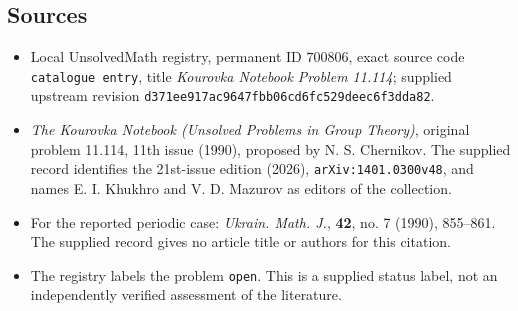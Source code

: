 \documentclass[11pt]{article}
\begin{document}
\subsection{Sources}
\begin{itemize}
\item Local UnsolvedMath registry, permanent ID \(700806\), exact source code \texttt{catalogue entry}, title \emph{Kourovka Notebook Problem 11.114}; supplied upstream revision \texttt{d371ee917ac9647fbb06cd6fc529deec6f3dda82}.
\item \emph{The Kourovka Notebook (Unsolved Problems in Group Theory)}, original problem 11.114, 11th issue (1990), proposed by N. S. Chernikov. The supplied record identifies the 21st-issue edition (2026), \texttt{arXiv:1401.0300v48}, and names E. I. Khukhro and V. D. Mazurov as editors of the collection.
\item For the reported periodic case: \emph{Ukrain. Math. J.}, \textbf{42}, no. 7 (1990), 855--861. The supplied record gives no article title or authors for this citation.
\item The registry labels the problem \texttt{open}. This is a supplied status label, not an independently verified assessment of the literature.
\end{itemize}
\end{document}
